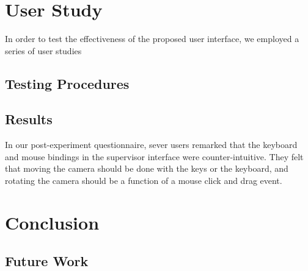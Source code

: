 \chapter{User Study}

In order to test the effectiveness of the proposed user interface, we employed  a series of user studies 

\section{Testing Procedures}

\section{Results}
In our post-experiment questionnaire, sever users remarked that the keyboard and mouse bindings in the supervisor interface were counter-intuitive. They felt that moving the camera should be done with the keys or the keyboard, and rotating the camera should be a function of a mouse click and drag event.
\chapter{Conclusion}

\section{Future Work}
\label{section:futurework}